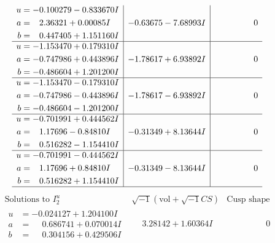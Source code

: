 \documentclass[1p]{elsarticle_modified}
\theoremstyle{definition}
\newcommand{\I}{\sqrt{-1}}
\begin{document}
$$\begin{array}{c|c|c}
\begin{aligned}
u &= -0.100279 - 0.833670 I \\
a &= \phantom{-}2.36321 + 0.00085 I \\
b &= \phantom{-}0.447405 + 1.151160 I\end{aligned}
 & -0.63675 - 7.68993 I & \phantom{-0.000000 } 0 \\ \hline\begin{aligned}
u &= -1.153470 + 0.179310 I \\
a &= -0.747986 + 0.443896 I \\
b &= -0.486604 + 1.201200 I\end{aligned}
 & -1.78617 + 6.93892 I & \phantom{-0.000000 } 0 \\ \hline\begin{aligned}
u &= -1.153470 - 0.179310 I \\
a &= -0.747986 - 0.443896 I \\
b &= -0.486604 - 1.201200 I\end{aligned}
 & -1.78617 - 6.93892 I & \phantom{-0.000000 } 0 \\ \hline\begin{aligned}
u &= -0.701991 + 0.444562 I \\
a &= \phantom{-}1.17696 - 0.84810 I \\
b &= \phantom{-}0.516282 - 1.154410 I\end{aligned}
 & -0.31349 + 8.13644 I & \phantom{-0.000000 } 0 \\ \hline\begin{aligned}
u &= -0.701991 - 0.444562 I \\
a &= \phantom{-}1.17696 + 0.84810 I \\
b &= \phantom{-}0.516282 + 1.154410 I\end{aligned}
 & -0.31349 - 8.13644 I & \phantom{-0.000000 } 0\\
 \hline 
 \end{array}$$\newpage$$\begin{array}{c|c|c}  
\text{Solutions to }I^u_{2}& \I (\text{vol} + \sqrt{-1}CS) & \text{Cusp shape}\\
 \hline 
\begin{aligned}
u &= -0.024127 + 1.204100 I \\
a &= \phantom{-}0.686741 + 0.070014 I \\
b &= \phantom{-}0.304156 + 0.429506 I\end{aligned}
 & \phantom{-}3.28142 + 1.60364 I & \phantom{-0.000000 } 0 \\ \hline\begin{aligned}

\end{aligned}
\end{array}$$
\end{document}
